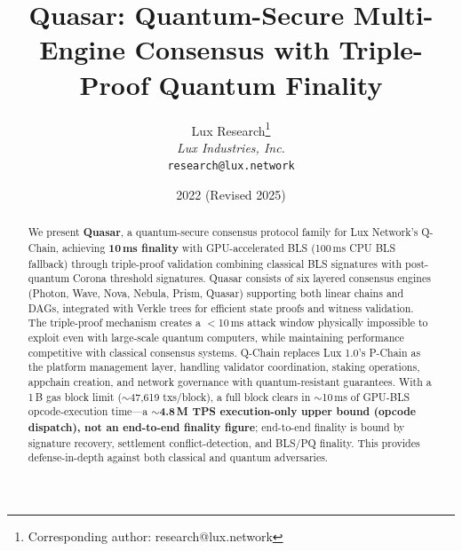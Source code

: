 \documentclass[11pt]{article}
\title{Quasar: Quantum-Secure Multi-Engine Consensus with Triple-Proof Quantum Finality}
\author{
Lux Research\thanks{Corresponding author: research@lux.network}\\
\textit{Lux Industries, Inc.}\\
\texttt{research@lux.network}
}
\date{2022 (Revised 2025)}
\begin{document}
\luxcoverpage

\begin{abstract}
We present \textbf{Quasar}, a quantum-secure consensus protocol family for Lux Network's Q-Chain, achieving \textbf{10\,ms finality} with GPU-accelerated BLS (100\,ms CPU BLS fallback) through triple-proof validation combining classical BLS signatures with post-quantum Corona threshold signatures. Quasar consists of six layered consensus engines (Photon, Wave, Nova, Nebula, Prism, Quasar) supporting both linear chains and DAGs, integrated with Verkle trees for efficient state proofs and witness validation. The triple-proof mechanism creates a $<$10\,ms attack window physically impossible to exploit even with large-scale quantum computers, while maintaining performance competitive with classical consensus systems. Q-Chain replaces Lux 1.0's P-Chain as the platform management layer, handling validator coordination, staking operations, appchain creation, and network governance with quantum-resistant guarantees. With a 1\,B gas block limit ($\sim$47{,}619 txs/block), a full block clears in $\sim$10\,ms of GPU-BLS opcode-execution time---a \textbf{$\sim$4.8\,M TPS execution-only upper bound (opcode dispatch), not an end-to-end finality figure}; end-to-end finality is bound by signature recovery, settlement conflict-detection, and BLS/PQ finality. This provides defense-in-depth against both classical and quantum adversaries.
\end{abstract}















\end{document}

